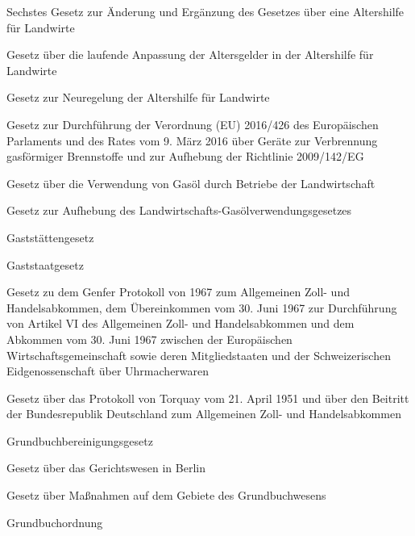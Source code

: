 \item[{GALÄndG-6}] Sechstes Gesetz zur Änderung und Ergänzung des Gesetzes über eine Altershilfe für Landwirte

\item[{GALÄndG-7}] Gesetz über die laufende Anpassung der Altersgelder in der Altershilfe für Landwirte

\item[{GALNReglG}] Gesetz zur Neuregelung der Altershilfe für Landwirte

\item[{GasgeräteDG}] Gesetz zur Durchführung der Verordnung (EU) 2016/426 des Europäischen Parlaments und des Rates vom 9. März 2016 über Geräte zur Verbrennung gasförmiger Brennstoffe und zur Aufhebung der Richtlinie 2009/142/EG

\item[{GasÖlVerwLwG}] Gesetz über die Verwendung von Gasöl durch Betriebe der Landwirtschaft

\item[{GasÖlVerwLwGAufhG}] Gesetz zur Aufhebung des Landwirtschafts-Gasölverwendungsgesetzes

\item[{GastG}] Gaststättengesetz

\item[{GastStG}] Gaststaatgesetz

\item[{GATTAbkProt1967G}] Gesetz zu dem Genfer Protokoll von 1967 zum Allgemeinen Zoll- und Handelsabkommen, dem Übereinkommen vom 30. Juni 1967 zur Durchführung von Artikel VI des Allgemeinen Zoll- und Handelsabkommen und dem Abkommen vom 30. Juni 1967 zwischen der Europäischen Wirtschaftsgemeinschaft sowie deren Mitgliedstaaten und der Schweizerischen Eidgenossenschaft über Uhrmacherwaren

\item[{GATTG}] Gesetz über das Protokoll von Torquay vom 21. April 1951 und über den Beitritt der Bundesrepublik Deutschland zum Allgemeinen Zoll- und Handelsabkommen

\item[{GBBerG-1993}] Grundbuchbereinigungsgesetz

\item[{GBlnG}] Gesetz über das Gerichtswesen in Berlin

\item[{GBMaßnG}] Gesetz über Maßnahmen auf dem Gebiete des Grundbuchwesens

\item[{GBO}] Grundbuchordnung

